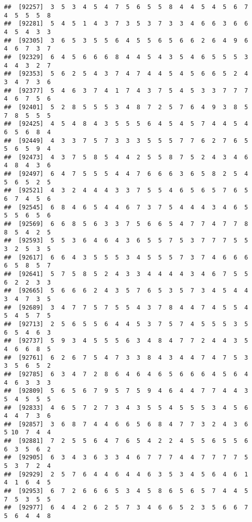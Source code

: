 \documentclass[
]{book}
\begin{document}
\begin{verbatim}
##  [92257]  3  5  3  4  5  4  7  5  6  5  5  8  4  4  5  4  5  6  7  4  5  5  5  8
##  [92281]  5  4  5  1  4  3  7  3  5  3  7  3  3  4  6  6  3  6  6  4  5  4  3  3
##  [92305]  3  6  5  3  5  5  6  4  5  5  6  5  6  6  2  6  4  9  6  4  6  7  3  7
##  [92329]  6  4  5  6  6  6  8  4  4  5  4  3  5  4  6  5  5  5  3  4  4  3  2  7
##  [92353]  5  6  2  5  4  3  7  4  7  4  4  5  4  5  6  6  5  2  4  3  4  7  3  6
##  [92377]  5  4  6  3  7  4  1  7  4  3  7  5  4  5  3  3  7  7  7  4  6  7  5  6
##  [92401]  5  2  8  5  5  5  3  4  8  7  2  5  7  6  4  9  3  8  5  7  8  5  5  5
##  [92425]  4  5  4  8  4  3  5  5  5  6  4  5  4  5  7  4  4  5  4  6  5  6  8  4
##  [92449]  4  3  3  7  5  7  3  3  3  5  5  5  7  7  6  2  7  6  5  5  6  5  9  4
##  [92473]  4  3  7  5  8  5  4  4  2  5  5  8  7  5  2  4  3  4  6  4  8  4  3  6
##  [92497]  6  4  7  5  5  5  4  4  7  6  6  6  3  6  5  8  2  5  4  5  6  5  2  5
##  [92521]  4  3  2  4  4  4  3  3  7  5  5  4  6  5  6  5  7  6  5  6  7  4  5  6
##  [92545]  6  8  4  6  5  4  4  6  7  3  7  5  4  4  4  3  4  6  5  5  5  6  5  6
##  [92569]  6  6  8  5  6  3  3  7  5  6  6  5  4  7  7  4  7  7  8  8  5  4  2  5
##  [92593]  5  5  3  6  4  6  4  3  6  5  5  7  5  3  7  7  7  5  5  3  2  5  3  5
##  [92617]  6  6  4  3  5  5  5  3  4  5  5  5  7  3  7  4  6  6  6  6  5  8  5  7
##  [92641]  5  7  5  8  5  2  4  3  3  4  4  4  4  3  4  6  7  5  5  6  2  2  3  3
##  [92665]  5  6  6  6  2  4  3  5  7  6  5  3  5  7  3  4  5  4  4  3  4  7  3  5
##  [92689]  3  4  7  7  5  7  5  5  4  3  7  8  4  4  7  4  5  5  4  5  4  5  7  5
##  [92713]  2  5  6  5  5  6  4  4  5  3  7  5  7  4  5  5  5  3  5  6  5  4  6  3
##  [92737]  5  9  3  4  5  5  5  6  3  4  8  4  7  7  2  4  4  3  5  4  6  6  8  5
##  [92761]  6  2  6  7  5  4  7  3  3  8  4  3  4  4  7  4  7  5  3  3  5  6  5  2
##  [92785]  6  3  4  7  2  8  6  4  6  4  6  5  6  6  6  4  5  6  4  4  6  3  3  3
##  [92809]  5  6  5  6  7  9  5  7  5  9  4  6  4  4  7  7  4  4  3  5  4  5  5  5
##  [92833]  4  6  5  7  2  7  3  4  3  5  5  4  5  5  5  3  4  5  6  4  4  7  3  6
##  [92857]  3  6  8  7  4  4  6  6  5  6  8  4  7  7  3  2  4  3  6  5 10  7  4  4
##  [92881]  7  2  5  5  6  4  7  6  5  4  2  2  4  5  5  6  5  5  6  6  3  5  6  2
##  [92905]  6  3  4  3  6  3  3  4  6  7  7  7  4  4  7  7  7  7  5  5  3  7  2  4
##  [92929]  2  5  7  6  4  4  6  4  4  6  3  5  3  4  5  6  4  6  1  4  1  6  4  5
##  [92953]  6  7  2  6  6  6  5  3  4  5  8  6  5  6  5  7  4  4  5  7  5  3  5  5
##  [92977]  6  4  4  2  6  2  5  7  3  4  6  6  5  2  3  5  6  6  7  5  6  4  4  8

\end{verbatim}
\end{document}

